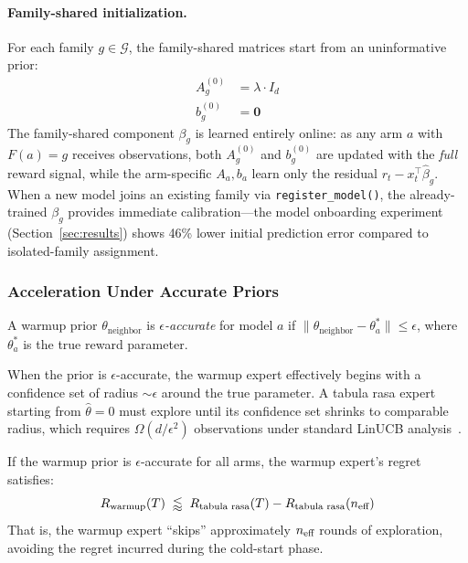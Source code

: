 \paragraph{Family-shared initialization.}
For each family $g \in \mathcal{G}$, the family-shared matrices start from an
uninformative prior:
\begin{align}
A_g^{(0)} &= \lambda \cdot I_d \label{eq:warmup_A0} \\
b_g^{(0)} &= \mathbf{0} \label{eq:warmup_b0}
\end{align}
The family-shared component $\beta_g$ is learned entirely online: as any arm
$a$ with $F(a) = g$ receives observations, both $A_g^{(0)}$ and $b_g^{(0)}$
are updated with the \emph{full} reward signal, while the arm-specific
$A_a, b_a$ learn only the residual $r_t - x_t^\top \hat{\beta}_g$.  When a
new model joins an existing family via \texttt{register\_model()}, the
already-trained $\beta_g$ provides immediate calibration---the model
onboarding experiment (Section~\ref{sec:results}) shows 46\% lower initial
prediction error compared to isolated-family assignment.

\subsubsection{Acceleration Under Accurate Priors}

\begin{definition}
\label{def:prior_accuracy}
A warmup prior $\theta_{\text{neighbor}}$ is \emph{$\epsilon$-accurate} for model $a$ if
$\|\theta_{\text{neighbor}} - \theta_a^*\| \leq \epsilon$, where $\theta_a^*$
is the true reward parameter.
\end{definition}

When the prior is $\epsilon$-accurate, the warmup expert effectively begins
with a confidence set of radius ${\sim}\epsilon$ around the true parameter.  A
tabula rasa expert starting from $\hat{\theta} = 0$ must explore until its
confidence set shrinks to comparable radius, which requires $\Omega(d / \epsilon^2)$
observations under standard LinUCB analysis~\cite{abbasi2011improved}.

\begin{theorem}
\label{thm:warmup_acceleration}
If the warmup prior is $\epsilon$-accurate for all arms, the warmup expert's
regret satisfies:
\begin{equation}
R_{\textnormal{warmup}}(T)
\;\lessapprox\;
R_{\textnormal{tabula rasa}}(T) - R_{\textnormal{tabula rasa}}(n_{\text{eff}})
\label{eq:warmup_savings}
\end{equation}
That is, the warmup expert ``skips'' approximately $n_{\text{eff}}$ rounds of
exploration, avoiding the regret incurred during the cold-start phase.
\end{theorem}

